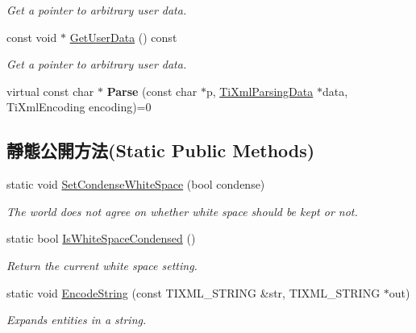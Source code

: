 \begin{DoxyCompactItemize}
\begin{DoxyCompactList}\small\item\em Get a pointer to arbitrary user data. \end{DoxyCompactList}\item 
const void $\ast$ \hyperlink{class_ti_xml_base_ad0120210e4680ef2088601753ce0ede4}{Get\+User\+Data} () const \hypertarget{class_ti_xml_base_ad0120210e4680ef2088601753ce0ede4}{}\label{class_ti_xml_base_ad0120210e4680ef2088601753ce0ede4}

\begin{DoxyCompactList}\small\item\em Get a pointer to arbitrary user data. \end{DoxyCompactList}\item 
virtual const char $\ast$ {\bfseries Parse} (const char $\ast$p, \hyperlink{class_ti_xml_parsing_data}{Ti\+Xml\+Parsing\+Data} $\ast$data, Ti\+Xml\+Encoding encoding)=0\hypertarget{class_ti_xml_base_a00e4edb0219d00a1379c856e5a1d2025}{}\label{class_ti_xml_base_a00e4edb0219d00a1379c856e5a1d2025}

\end{DoxyCompactItemize}
\subsection*{靜態公開方法(Static Public Methods)}
\begin{DoxyCompactItemize}
\item 
static void \hyperlink{class_ti_xml_base_a0f799ec645bfb8d8a969e83478f379c1}{Set\+Condense\+White\+Space} (bool condense)
\begin{DoxyCompactList}\small\item\em The world does not agree on whether white space should be kept or not. \end{DoxyCompactList}\item 
static bool \hyperlink{class_ti_xml_base_ad4b1472531c647a25b1840a87ae42438}{Is\+White\+Space\+Condensed} ()\hypertarget{class_ti_xml_base_ad4b1472531c647a25b1840a87ae42438}{}\label{class_ti_xml_base_ad4b1472531c647a25b1840a87ae42438}

\begin{DoxyCompactList}\small\item\em Return the current white space setting. \end{DoxyCompactList}\item 
static void \hyperlink{class_ti_xml_base_a32ed202562b58de64c7d799ca3c9db98}{Encode\+String} (const T\+I\+X\+M\+L\+\_\+\+S\+T\+R\+I\+NG \&str, T\+I\+X\+M\+L\+\_\+\+S\+T\+R\+I\+NG $\ast$out)
\begin{DoxyCompactList}\small\item\em Expands entities in a string. \end{DoxyCompactList}\end{DoxyCompactItemize}
